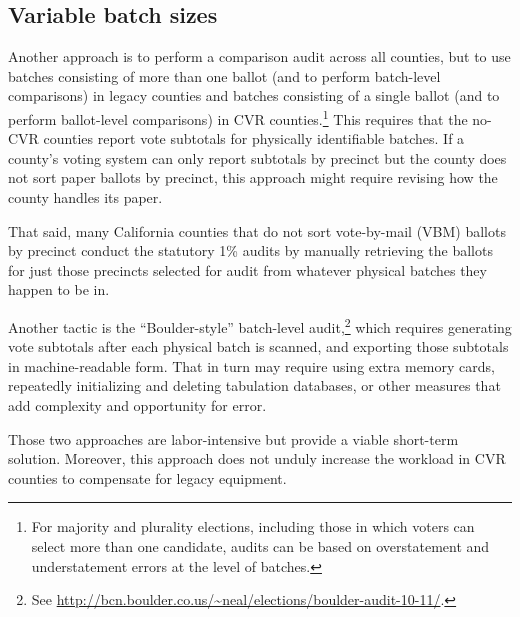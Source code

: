 \documentclass[runningheads]{llncs}
\begin{document}
\subsection{Variable batch sizes} \label{sec:variable}

Another approach is to perform a comparison audit across all counties, but to use batches consisting
of more than one ballot (and to perform batch-level comparisons)
in legacy counties and batches consisting of a single ballot (and to perform ballot-level comparisons) in CVR counties.\footnote{%
 For majority and plurality elections, including those in which voters can select more than one candidate,
  audits can be based on overstatement and understatement errors at the level of batches.
}
This requires that the no-CVR counties report vote subtotals
for physically identifiable batches.
If a county's voting system can only report subtotals by precinct but 
the county does not sort paper ballots by
precinct, this approach might require revising how the county handles its
paper.

That said, many California counties that do not sort vote-by-mail (VBM)
ballots by precinct conduct the statutory 1\% audits by manually retrieving the ballots 
for just those precincts selected for audit from whatever physical batches they happen to be in.%

Another tactic is the ``Boulder-style'' batch-level audit,\footnote{%
 See \url{http://bcn.boulder.co.us/~neal/elections/boulder-audit-10-11/}.
}
which requires generating 
vote subtotals after each physical batch is scanned, and exporting those subtotals in machine-readable form.
That in turn may require using extra memory cards, repeatedly initializing and deleting tabulation databases,
or other measures that add complexity and opportunity for error.

Those two approaches are labor-intensive but provide a viable short-term solution. %
Moreover, this approach does not unduly increase the workload in CVR counties
to compensate for legacy equipment.
\end{document}
